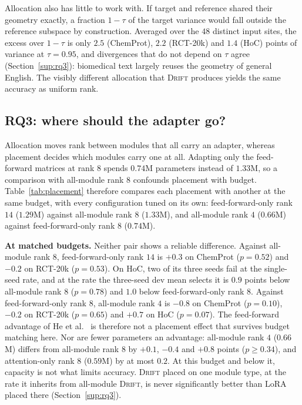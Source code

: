 \documentclass[conference]{IEEEtran}
\newcommand{\method}{\textsc{Drift}}
\begin{document}
Allocation also has little to work with. If target and reference shared their
geometry exactly, a fraction $1-\tau$ of the target variance would fall outside
the reference subspace by construction. Averaged over the $48$ distinct input
sites, the excess over $1-\tau$ is only $2.5$ (ChemProt), $2.2$ (RCT-20k) and
$1.4$ (HoC) points of variance at $\tau = 0.95$, and divergences that do not
depend on $\tau$ agree (Section~\ref{sup:rq3}): biomedical text largely reuses
the geometry of general English. The visibly different allocation that
\method{} produces yields the same accuracy as uniform rank.

\subsection{RQ3: where should the adapter go?}
\label{sec:placement}


Allocation moves rank between modules that all carry an adapter, whereas
placement decides which modules carry one at all. Adapting only the feed-forward
matrices at rank $8$ spends $0.74$M parameters instead of $1.33$M, so a
comparison with all-module rank $8$ confounds placement with budget.
Table~\ref{tab:placement} therefore compares each placement with another at the
same budget, with every configuration tuned on its own: feed-forward-only rank
$14$ ($1.29$M) against all-module rank $8$ ($1.33$M), and all-module rank $4$
($0.66$M) against feed-forward-only rank $8$ ($0.74$M).

\noindent\textbf{At matched budgets.} Neither pair shows a reliable difference.
Against all-module rank $8$, feed-forward-only rank $14$ is $+0.3$ on ChemProt
($p = 0.52$) and $-0.2$ on RCT-20k ($p = 0.53$). On HoC, two of its three seeds
fail at the single-seed rate, and at the rate the three-seed dev mean selects it
is $0.9$ points below all-module rank $8$ ($p = 0.78$) and $1.0$ below
feed-forward-only rank $8$. Against feed-forward-only rank $8$, all-module rank
$4$ is $-0.8$ on ChemProt ($p = 0.10$), $-0.2$ on RCT-20k ($p = 0.65$) and $+0.7$
on HoC ($p = 0.07$). The feed-forward advantage of He et
al.~\cite{he2022unified} is therefore not a placement effect that survives budget
matching here. Nor are fewer parameters an advantage: all-module rank $4$
($0.66$M) differs from all-module rank $8$ by $+0.1$, $-0.4$ and $+0.8$ points
($p \ge 0.34$), and attention-only rank $8$ ($0.59$M) by at most $0.2$. At this
budget and below it, capacity is not what limits accuracy. \method{} placed on
one module type, at the rate it inherits from all-module \method{}, is never
significantly better than LoRA placed there (Section~\ref{sup:rq3}).
\end{document}
